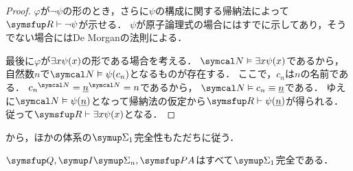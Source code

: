 \begin{proof}
	\(\varphi\)が\(\lnot \psi\)の形のとき，さらに\(\psi\)の構成に関する帰納法によって\(\RArithmetic \provable \lnot \psi\)が示せる．
	\(\psi\)が原子論理式の場合にはすでに示してあり，そうでない場合にはDe Morganの法則による．

	最後に\(\varphi\)が\(\exists x \apply{\psi}{x}\)の形である場合を考える．
	\(\standardmodel \satisfy \exists x \apply{\psi}{x}\)であるから，自然数\(n\)で\(\standardmodel \satisfy \apply{\psi}{c_n}\)となるものが存在する．
	ここで，\(c_n\)は\(n\)の名前である．
	\(\interpretation{\standardmodel}{c_n} = \interpretation{\standardmodel}{\numeral{n}} = n\)であるから，
	\(\standardmodel \satisfy c_n \objeq \numeral{n}\)である．
	ゆえに\(\standardmodel \satisfy \apply{\psi}{\numeral{n}}\)となって帰納法の仮定から\(\RArithmetic \provable \apply{\psi}{\numeral{n}}\)が得られる．
	従って\(\RArithmetic \provable \exists x \apply{\psi}{x}\)となる．
\end{proof}

から，ほかの体系の\(\SigmaFormula_1\)完全性もただちに従う．

\begin{Corollary}
	\(\Robinson, \SigmaFormulaInduction_n, \PA\)はすべて\(\SigmaFormula_1\)完全である．
\end{Corollary}